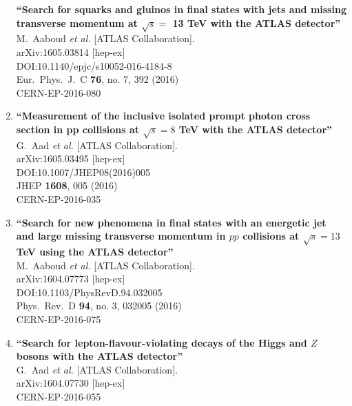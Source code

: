 \documentclass{article}
\begin{document}
\begin{enumerate}
{\bf ``Search for squarks and gluinos in final states with jets and missing transverse momentum at $\sqrt{s} =$ 13 TeV with the ATLAS detector''}
  \\{}M.~Aaboud {\it et al.} [ATLAS Collaboration].
  \\{}arXiv:1605.03814 [hep-ex]
  \\{}DOI:10.1140/epjc/s10052-016-4184-8
  \\{}Eur.\ Phys.\ J.\ C {\bf 76}, no. 7, 392 (2016)
  \\{}CERN-EP-2016-080
\item%
{\bf ``Measurement of the inclusive isolated prompt photon cross section in pp collisions at $ \sqrt{s}=8 $ TeV with the ATLAS detector''}
  \\{}G.~Aad {\it et al.} [ATLAS Collaboration].
  \\{}arXiv:1605.03495 [hep-ex]
  \\{}DOI:10.1007/JHEP08(2016)005
  \\{}JHEP {\bf 1608}, 005 (2016)
  \\{}CERN-EP-2016-035
\item%
{\bf ``Search for new phenomena in final states with an energetic jet and large missing transverse momentum in $pp$ collisions at $\sqrt{s}=13$  TeV using the ATLAS detector''}
  \\{}M.~Aaboud {\it et al.} [ATLAS Collaboration].
  \\{}arXiv:1604.07773 [hep-ex]
  \\{}DOI:10.1103/PhysRevD.94.032005
  \\{}Phys.\ Rev.\ D {\bf 94}, no. 3, 032005 (2016)
  \\{}CERN-EP-2016-075
\item%
{\bf ``Search for lepton-flavour-violating decays of the Higgs and $Z$ bosons with the ATLAS detector''}
  \\{}G.~Aad {\it et al.} [ATLAS Collaboration].
  \\{}arXiv:1604.07730 [hep-ex]
  \\{}CERN-EP-2016-055

\end{enumerate}
\end{document}
